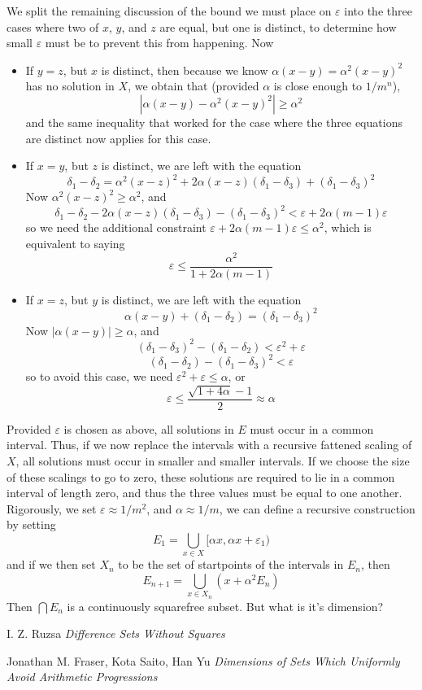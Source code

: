 \documentclass{article}
\theoremstyle{plain}
\theoremstyle{plain}
\begin{document}
We split the remaining discussion of the bound we must place on $\varepsilon$ into the three cases where two of $x$, $y$, and $z$ are equal, but one is distinct, to determine how small $\varepsilon$ must be to prevent this from happening. Now
%
\begin{itemize}
    \item If $y = z$, but $x$ is distinct, then because we know $\alpha(x - y) = \alpha^2(x - y)^2$ has no solution in $X$, we obtain that (provided $\alpha$ is close enough to $1/m^n$),
    \[ |\alpha(x - y) - \alpha^2(x-y)^2| \geq \alpha^2 \]
    and the same inequality that worked for the case where the three equations are distinct now applies for this case.

    \item If $x = y$, but $z$ is distinct, we are left with the equation
    \[ \delta_1 - \delta_2 = \alpha^2(x - z)^2 + 2\alpha(x - z)(\delta_1 - \delta_3) + (\delta_1 - \delta_3)^2 \]
    Now $\alpha^2(x - z)^2 \geq \alpha^2$, and
    \[ \delta_1 - \delta_2 - 2\alpha(x-z)(\delta_1 - \delta_3) - (\delta_1 - \delta_3)^2 < \varepsilon + 2\alpha(m-1)\varepsilon \]
    so we need the additional constraint $\varepsilon + 2\alpha(m-1)\varepsilon \leq \alpha^2$, which is equivalent to saying
    \[ \varepsilon \leq \frac{\alpha^2}{1 + 2\alpha(m-1)} \]

    \item If $x = z$, but $y$ is distinct, we are left with the equation
    \[ \alpha(x - y) + (\delta_1 - \delta_2) = (\delta_1 - \delta_3)^2 \]
    Now $|\alpha(x-y)| \geq \alpha$, and
    \[ (\delta_1 - \delta_3)^2 - (\delta_1 - \delta_2) < \varepsilon^2 + \varepsilon \]
    \[ (\delta_1 - \delta_2) - (\delta_1 - \delta_3)^2 < \varepsilon \]
    so to avoid this case, we need $\varepsilon^2 + \varepsilon \leq \alpha$, or
    \[ \varepsilon \leq \frac{\sqrt{1 + 4\alpha} - 1}{2} \approx \alpha \]
\end{itemize}
%
Provided $\varepsilon$ is chosen as above, all solutions in $E$ must occur in a common interval. Thus, if we now replace the intervals with a recursive fattened scaling of $X$, all solutions must occur in smaller and smaller intervals. If we choose the size of these scalings to go to zero, these solutions are required to lie in a common interval of length zero, and thus the three values must be equal to one another. Rigorously, we set $\varepsilon \approx 1/m^2$, and $\alpha \approx 1/m$, we can define a recursive construction by setting
%
\[ E_1 = \bigcup_{x \in X} [\alpha x, \alpha x + \varepsilon_1) \]
%
and if we then set $X_n$ to be the set of startpoints of the intervals in $E_n$, then
%
\[ E_{n+1} = \bigcup_{x \in X_n} (x + \alpha^2 E_n) \]
%
Then $\bigcap E_n$ is a continuously squarefree subset. But what is it's dimension?

\begin{thebibliography}{9}

I. Z. Ruzsa
\textit{Difference Sets Without Squares}

Jonathan M. Fraser, Kota Saito, Han Yu
\textit{Dimensions of Sets Which Uniformly Avoid Arithmetic Progressions}

\end{thebibliography}
\end{document}
